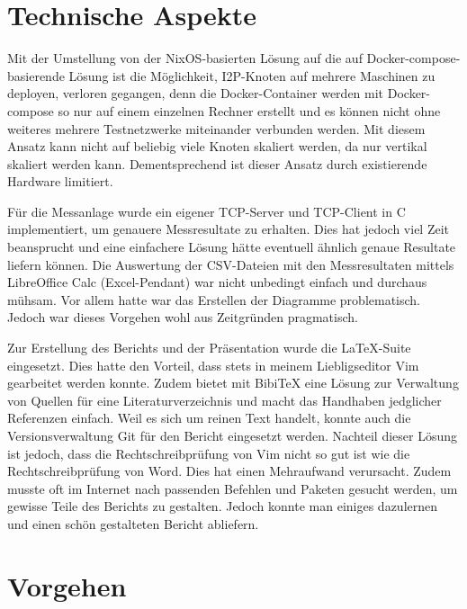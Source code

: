 \section{Technische Aspekte}\label{sec:technische_aspekte}

Mit der Umstellung von der NixOS-basierten Lösung auf die auf Docker-compose-basierende Lösung ist
die Möglichkeit, I2P-Knoten auf mehrere Maschinen zu deployen, verloren gegangen,
denn die Docker-Container werden mit Docker-compose so nur auf einem einzelnen Rechner erstellt und
es können nicht ohne weiteres mehrere Testnetzwerke miteinander verbunden werden.
Mit diesem Ansatz kann nicht auf beliebig viele Knoten skaliert werden, da nur vertikal skaliert werden kann.
Dementsprechend ist dieser Ansatz durch existierende Hardware limitiert.

Für die Messanlage wurde ein eigener TCP-Server und TCP-Client in C implementiert, um genauere Messresultate zu erhalten.
Dies hat jedoch viel Zeit beansprucht und eine einfachere Lösung hätte
eventuell ähnlich genaue Resultate liefern können.
Die Auswertung der CSV-Dateien mit den Messresultaten mittels LibreOffice Calc (Excel-Pendant) war nicht unbedingt einfach und durchaus mühsam.
Vor allem hatte war das Erstellen der Diagramme problematisch. Jedoch war dieses Vorgehen wohl aus Zeitgründen pragmatisch.

Zur Erstellung des Berichts und der Präsentation wurde die \LaTeX-Suite eingesetzt.
Dies hatte den Vorteil, dass stets in meinem Liebligseditor Vim gearbeitet werden konnte.
Zudem bietet \LaTe  mit BibiTeX eine Lösung zur Verwaltung von Quellen für eine Literaturverzeichnis und macht das Handhaben jedglicher Referenzen einfach. Weil es sich um reinen Text handelt, konnte auch die Versionsverwaltung Git für den Bericht eingesetzt werden.
Nachteil dieser Lösung ist jedoch, dass die Rechtschreibprüfung von Vim nicht so gut ist wie die Rechtschreibprüfung von Word.
Dies hat einen Mehraufwand verursacht.
Zudem musste oft im Internet nach passenden Befehlen und Paketen gesucht werden, um gewisse Teile des Berichts zu gestalten.
Jedoch konnte man einiges dazulernen und einen schön gestalteten Bericht abliefern.

\section{Vorgehen}\label{sec:eval_vorgehen}

